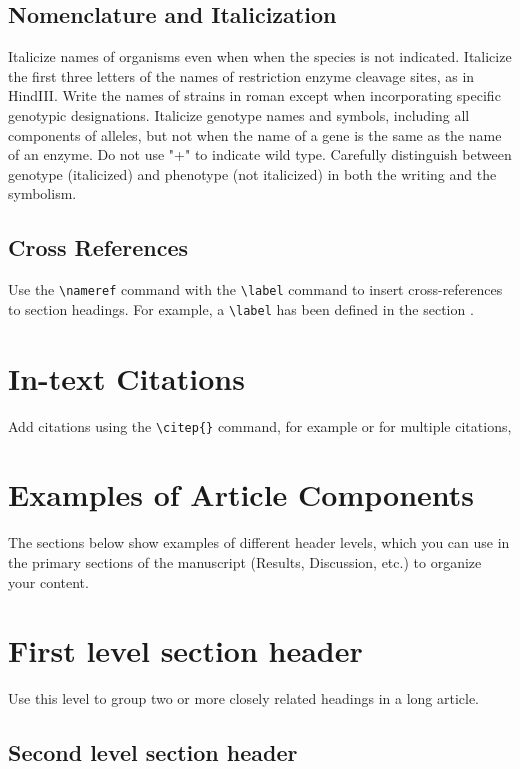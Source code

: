 \documentclass[9pt,twocolumn,twoside]{gsajnl}
\begin{document}
\subsection{Nomenclature and Italicization} Italicize names of organisms even when  when the species is not indicated.  Italicize the first three letters of the names of restriction enzyme cleavage sites, as in HindIII. Write the names of strains in roman except when incorporating specific genotypic designations. Italicize genotype names and symbols, including all components of alleles, but not when the name of a gene is the same as the name of an enzyme. Do not use "+" to indicate wild type. Carefully distinguish between genotype (italicized) and phenotype (not italicized) in both the writing and the symbolism.

\subsection{Cross References}
Use the \verb|\nameref| command with the \verb|\label| command to insert cross-references to section headings. For example, a \verb|\label| has been defined in the section .

\section{In-text Citations}

Add citations using the \verb|\citep{}| command, for example \citep{neher2013genealogies} or for multiple citations, \citep{neher2013genealogies, rodelsperger2014characterization}

\section{Examples of Article Components}
\label{sec:examples}

The sections below show examples of different header levels, which you can use in the primary sections of the manuscript (Results, Discussion, etc.) to organize your content.

\section{First level section header}

Use this level to group two or more closely related headings in a long article.

\subsection{Second level section header}
\end{document}
